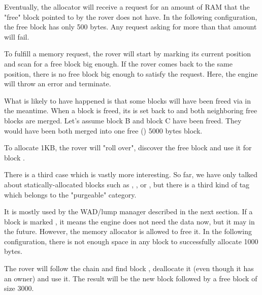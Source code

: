 Eventually, the allocator will receive a request for an amount of RAM that the "free" block pointed to by the rover does not have. In the following configuration, the free block has only 500 bytes. Any request asking for more than that amount will fail.\\
\par
{}
\par
To fulfill a memory request, the rover will start by marking its current position and scan for a free block big enough. If the rover comes back to the same position, there is no free block big enough to satisfy the request. Here, the engine will throw an error and terminate.\\
\par
What is likely to have happened is that some blocks will have been freed via  in the meantime. When a block is freed, its  is set back to  and both neighboring free blocks are merged. Let's assume block B and block C have been freed. They would have been both merged into one free () 5000 bytes block.\\
\par
{}
\par
To allocate 1KB, the rover will "roll over", discover the free block and use it for block .\\
\par
{}
\par
There is a third case which is vastly more interesting. So far, we have only talked about statically-allocated blocks such as , , or , but there is a third kind of tag which belongs to the "purgeable" category.\\
\par
It is mostly used by the WAD/lump manager described in the next section. If a block is marked , it means the engine does not need the data now, but it may in the future. However, the memory allocator is allowed to free it. In the following configuration, there is not enough space in any block to successfully allocate 1000 bytes.\\
\par
{}
\par
The rover will follow the chain and find block , deallocate it (even though it has an owner) and use it. The result will be the new block  followed by a free block of size 3000.\\
